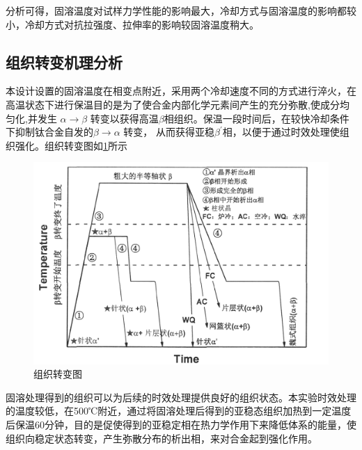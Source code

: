 分析可得，固溶温度对试样力学性能的影响最大，冷却方式与固溶温度的影响都较小，冷却方式对抗拉强度、拉伸率的影响较固溶温度稍大。

\subsection{组织转变机理分析}
本设计设置的固溶温度在相变点附近，采用两个冷却速度不同的方式进行淬火，在高温状态下进行保温目的是为了使合金内部化学元素间产生的充分弥散,使成分均匀化,并发生 $\alpha\to\beta$ 转变以获得高温$ \beta $相组织。保温一段时间后，在较快冷却条件下抑制钛合金自发的$\beta\to \alpha$ 转变， 从而获得亚稳$ \beta^{\prime} $相，以便于通过时效处理使组织强化。组织转变图如\ref{fig: micchange}所示\cite{YangJingJingJiGuangXuanQuRongHuaChengXingTi6Al4VHeJinDeZuZhiYanBianJiDiaoKong2017a}


\begin{figure}[h!]
	\centering
	\includegraphics[width=0.7\linewidth]{pic/组织转变图}
	\caption{组织转变图}
	\label{fig: micchange}
\end{figure}


固溶处理得到的组织可以为后续的时效处理提供良好的组织状态。本实验时效处理的温度较低，在500℃附近，通过将固溶处理后得到的亚稳态组织加热到一定温度后保温60分钟，目的是促使得到的亚稳定相在热力学作用下来降低体系的能量，使组织向稳定状态转变，产生弥散分布的析出相，来对合金起到强化作用。

